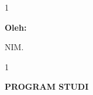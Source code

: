 \begin{titlepage}
\begin{spacing}{1}
\begin{center}
{\fontsize{12}{14.4}\selectfont\bfseries
 Oleh:\par
 \penulis\par
 NIM. \nim\par}
\end{center}
\end{spacing}

\vspace{2\baselineskip}

\begin{spacing}{1}
\begin{center}
{\fontsize{16}{19.2}\selectfont\bfseries
 PROGRAM STUDI \MakeUppercase{\prodi}\par
 \MakeUppercase{\institusi}\par
 \tahun\par}
\end{center}
\end{spacing}

\end{titlepage}
